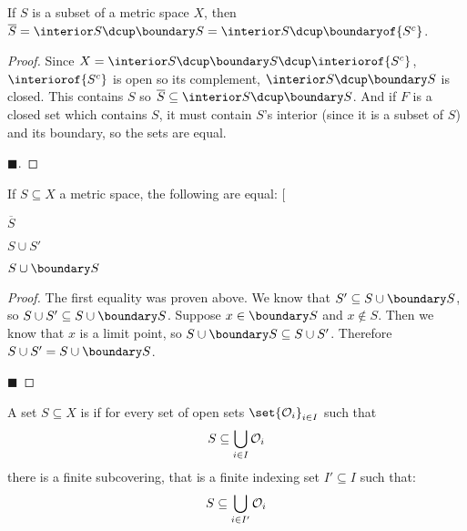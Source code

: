 \documentclass[10pt]{article}
\makeatletter
\def\@blist[#1]{%
    \bgroup\bgroup\par\vskip-\medskipamount%
    \gdef\item{%
        \par\egroup\bgroup\medskip\setbox0=\hbox{#1\quad}%
        \advance\leftskip by \wd0\leavevmode\kern-\wd0\box0%
    }%
}
\def\blist{\@ifnextchar[ \@blist {\@blist[$\bullet$]}}
\def\elist{\par\egroup\egroup\medskip}
\def\openset{{\cal O}}
\makeatother
\begin{document}
\begin{prop*}

    If $S$ is a subset of a metric space $X$, then $\overline S = \interior S\dcup\boundary S = \interior S\dcup\boundaryof{S^c}$.

\end{prop*}

\begin{proof}

    Since $X = \interior S\dcup\boundary S\dcup\interiorof{S^c}$, $\interiorof{S^c}$ is open so its complement, $\interior S\dcup\boundary S$ is closed.
    This contains $S$ so $\overline S\subseteq\interior S\dcup\boundary S$.
    And if $F$ is a closed set which contains $S$, it must contain $S$'s interior (since it is a subset of $S$) and its boundary, so the sets are equal.

    \hfill$\blacksquare$.

\end{proof}

\begin{thrm*}

    If $S\subseteq X$ a metric space, the following are equal:
    \blist
        \item $\overline S$
        \item $S\cup S'$
        \item $S\cup\boundary S$
    \elist

\end{thrm*}

\begin{proof}

    The first equality was proven above.
    We know that $S'\subseteq S\cup\boundary S$, so $S\cup S'\subseteq S\cup\boundary S$.
    Suppose $x\in\boundary S$ and $x\notin S$.
    Then we know that $x$ is a limit point, so $S\cup\boundary S\subseteq S\cup S'$.
    Therefore $S\cup S'=S\cup\boundary S$.

    \hfill$\blacksquare$

\end{proof}

\begin{defn*}

    A set $S\subseteq X$ is  if for every set of open sets $\set{\openset_i}_{i\in I}$ such that
    \[ S\subseteq\bigcup_{i\in I}\openset_i \]
    there is a finite subcovering, that is a finite indexing set $I'\subseteq I$ such that:
    \[ S\subseteq\bigcup_{i\in I'}\openset_i \]

\end{defn*}
\end{document}
